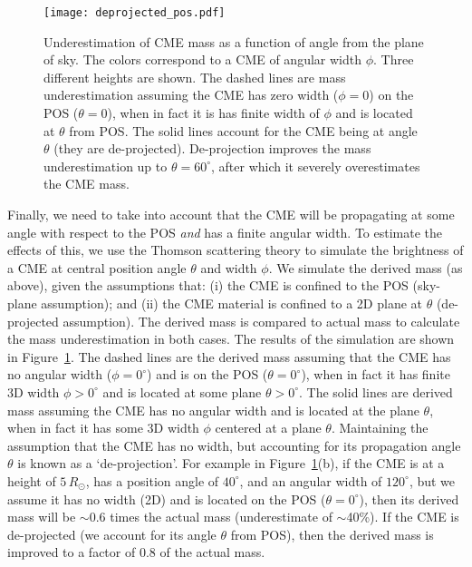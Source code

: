\begin{figure}[!t]
\begin{center}
\texttt{[image: deprojected\_pos.pdf]}
\caption[Uncertainty due to unknown POS angle and angular width]{Underestimation of CME mass as a function of angle from the plane of sky. The colors correspond to a CME of angular width $\phi$. Three different heights are shown. The dashed lines are mass underestimation assuming the CME has zero width ($\phi=0$) on the POS ($\theta=0$), when in fact it is has finite width of $\phi$ and is located at $\theta$ from POS. The solid lines account for the CME being at angle $\theta$ (they are de-projected). De-projection improves the mass underestimation up to $\theta=60^{\circ}$, after which it severely overestimates the CME mass.}
\label{fig:deprojection}
\end{center}
\end{figure}
Finally, we need to take into account that the CME will be propagating at some angle with respect to the POS \emph{and} has a finite angular width. To estimate the effects of this, we use the Thomson scattering theory to simulate the brightness of a CME at central position angle $\theta$ and width $\phi$. We simulate the derived mass (as above), given the assumptions that: (i) the CME is confined to the POS (sky-plane assumption); and (ii) the CME material is confined to a 2D plane at $\theta$ (de-projected assumption). The derived mass is compared to actual mass to calculate the mass underestimation in both cases.
The results of the simulation are shown in Figure~\ref{fig:deprojection}. The dashed lines are the derived mass assuming that the CME has no angular width ($\phi=0^{\circ}$) and is on the POS ($\theta=0^{\circ}$), when in fact it has finite 3D width $\phi>0^{\circ}$ and is located at some plane $\theta >0^{\circ}$. The solid lines are derived mass assuming the CME has no angular width and is located at the plane $\theta$, when in fact it has some 3D width $\phi$ centered at a plane $\theta$. Maintaining the assumption that the CME has no width, but accounting for its propagation angle $\theta$ is known as a `de-projection'. For example in Figure~\ref{fig:deprojection}(b), if the CME is at a height of $5\,R_{\odot}$, has a position angle of $40^{\circ}$, and an angular width of $120^{\circ}$, but we assume it has no width (2D) and is located on the POS ($\theta=0^{\circ}$), then its derived mass will be $\sim$0.6 times the actual mass (underestimate of $\sim$40\%). If the CME is de-projected (we account for its angle $\theta$ from POS), then the derived mass is improved to a factor of 0.8 of the actual mass. 


